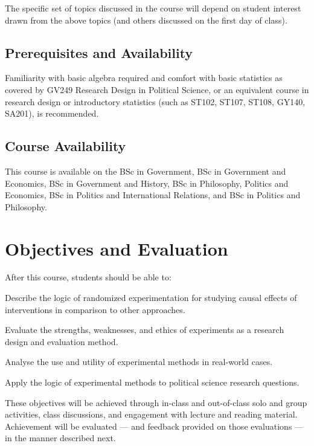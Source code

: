 \documentclass[12pt,a4paper]{article}
\begin{document}
\noindent The specific set of topics discussed in the course will depend on student interest drawn from the above topics (and others discussed on the first day of class).

\subsection*{Prerequisites and Availability}

Familiarity with basic algebra required and comfort with basic statistics as covered by GV249 Research Design in Political Science, or an equivalent course in research design or introductory statistics (such as ST102, ST107, ST108, GY140, SA201), is recommended.

\subsection*{Course Availability}

This course is available on the BSc in Government, BSc in Government and Economics, BSc in Government and History, BSc in Philosophy, Politics and Economics, BSc in Politics and International Relations, and BSc in Politics and Philosophy.

\section{Objectives and Evaluation}

After this course, students should be able to:

\begin{enumerate*}
\item Describe the logic of randomized experimentation for studying causal effects of interventions in comparison to other approaches.
\item Evaluate the strengths, weaknesses, and ethics of experiments as a research design and evaluation method.
\item Analyse the use and utility of experimental methods in real-world cases.
\item Apply the logic of experimental methods to political science research questions.
\end{enumerate*}

\noindent These objectives will be achieved through in-class and out-of-class solo and group activities, class discussions, and engagement with lecture and reading material. Achievement will be evaluated --- and feedback provided on those evaluations --- in the manner described next.
\end{document}
